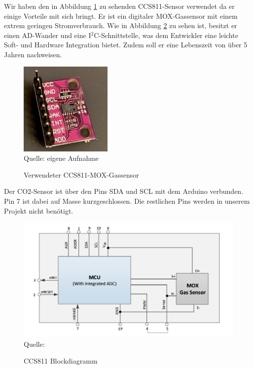 \label{CCS811}

Wir haben den in Abbildung \ref{fig:CCS811-Bild}  zu sehenden CCS811-Sensor verwendet da er einige Vorteile mit sich bringt. Er ist ein digitaler \ac{MOX}-Gassensor mit einem extrem geringen Stromverbrauch. Wie in Abbildung \ref{fig:ccs811Blockdiagramm} zu sehen ist, besitzt er einen \ac{AD}-Wander und eine I$^2$C-Schnittstelle, was dem Entwickler eine leichte Soft- und Hardware Integration bietet. Zudem soll er eine Lebenszeit von über 5 Jahren nachweisen. \cite[vgl. S. 1]{amsAG.2016} \\

\begin{figure}[!hbt]
	\centering
	\includegraphics[width=0.3\linewidth]{Images/CO2SensorCCS811}
	\footnotesize \\Quelle: eigene Aufnahme
	\caption{Verwendeter CCS811-\ac{MOX}-Gassensor}
	\label{fig:CCS811-Bild}
\end{figure}

Der CO2-Sensor ist über den Pins SDA und SCL mit dem Arduino verbunden. Pin 7 ist dabei auf Masse kurzgeschlossen. Die restlichen Pins werden in unserem Projekt nicht benötigt.

\begin{figure}[!hbt]
	\centering
	\includegraphics[width=0.9\linewidth]{Images/ccs811Blockdiagramm}
	\footnotesize{\\ Quelle: \cite[S. 3]{amsAG.2016}}
	\caption{CCS811 Blockdiagramm}
	\label{fig:ccs811Blockdiagramm}
\end{figure}

